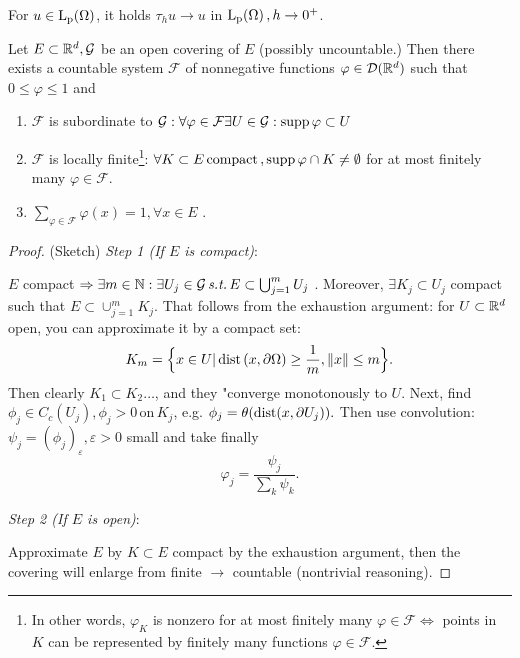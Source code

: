 \documentclass{article}
\begin{document}
\begin{lemma}
	For $u \in \LpSet{\Omega}$, it holds $\tau_h u \to u$ in $\LpSet{\Omega}, h\to 0^+$.
\end{lemma}

\begin{lemma}
	Let $E \subset {\mathbb R}^d, \mathcal{G}$ be an open covering of $E$ (possibly uncountable.) Then there exists a countable system $\mathcal{F}$ of nonnegative functions $\varphi \in \mathcal{D}({\mathbb R}^d)$ such that $0 \leq \varphi \leq 1$ and 
	\begin{enumerate}
		\item $\mathcal{F}$ is subordinate to $\mathcal{G}: \forall \varphi \in \mathcal{F} \exists U \in \mathcal{G}: \operatorname{supp} \varphi \subset U$
		\item $\mathcal{F}$ is locally finite\footnote{In other words, $\varphi_K$ is nonzero for at most finitely many $\varphi \in \mathcal{F} \Leftrightarrow$ points in $K$ can be represented by finitely many functions $\varphi \in \mathcal{F}.$}: $\forall K \subset E \, \text{compact} \,, \operatorname{supp} \varphi \cap K \neq \emptyset$ for at most finitely many $\varphi \in \mathcal{F}$.
		\item $\sum_{\varphi \in \mathcal{F}} \varphi(x) = 1, \forall x \in E$ .
	\end{enumerate}
\end{lemma}
\begin{proof}
	(Sketch)
	\textit{Step 1 (If $E$ is compact)}:

	$E$ compact $\Rightarrow \exists m \in {\mathbb N}: \exists U_j \in \mathcal{G} \, \text{\textit{s.t.}} \, E \subset \bigcup_{j=1}^{m}U_j$ . Moreover, $\exists K_j \subset U_j$ compact such that $E \subset \cup_{j=1}^m K_j$. That follows from the exhaustion argument: for $U \subset {\mathbb R}^d$ open, you can approximate it by a compact set:
	\[
		K_m = \Big\{x \in U| \operatorname{dist}\qty(x,\partial \Omega) \geq \frac{1}{m}, \norm{x} \leq m \Big\}.
	\]
	Then clearly $K_1 \subset K_2 \dots $, and they "converge monotonously to $U$.
	Next, find $\phi_j \in C_c(U_j), \phi_j >0 \, \text{on} \, K_j$, e.g. $\phi_j = \theta\qty(\operatorname{dist}(x,\partial U_j)).$ Then use convolution: $\psi_j = (\phi_j)_{\varepsilon}, \varepsilon > 0$ small and take finally
	\[
		\varphi_j = \frac{\psi_j}{\sum_k \psi_k}.
	\]
	

	\textit{Step 2 (If $E$ is open)}:

	Approximate $E$ by $K \subset E$ compact by the exhaustion argument, then the covering will enlarge from finite $\to$ countable (nontrivial reasoning).
\end{proof}
\end{document}
